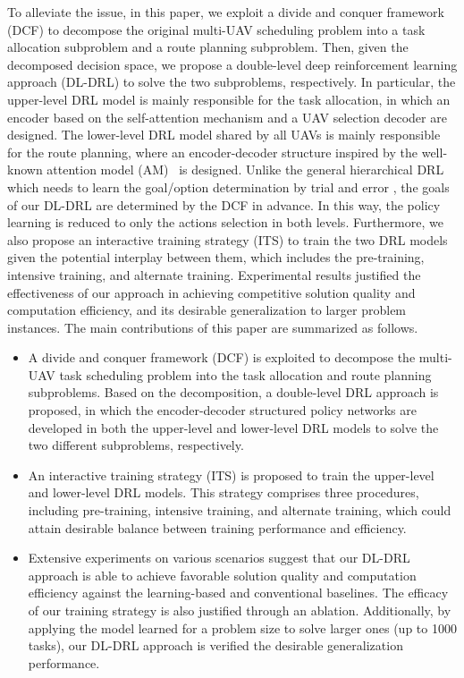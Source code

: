 \documentclass[lettersize,journal]{IEEEtran}
\begin{document}
	To alleviate the issue, in this paper, we exploit a divide and conquer framework (DCF) to decompose the original multi-UAV scheduling problem into a task allocation subproblem and a route planning subproblem. Then, given the decomposed decision space, we propose a double-level deep reinforcement learning approach (DL-DRL) to solve the two subproblems, respectively. In particular, the upper-level DRL model is mainly responsible for the task allocation, in which an encoder based on the self-attention mechanism \cite{vaswaniAttentionAllYou2017} and a UAV selection decoder are designed. The lower-level DRL model shared by all UAVs is mainly responsible for the route planning, where an encoder-decoder structure inspired by the well-known attention model (AM)~\cite{koolATTENTIONLEARNSOLVE2019a} is designed. Unlike the general hierarchical DRL which needs to learn the goal/option determination by trial and error \cite{baconOptionCriticArchitecture2017, nachumDataEfficientHierarchicalReinforcement2018}, the goals of our DL-DRL are determined by the DCF in advance. In this way, the policy learning is reduced to only the actions selection in both levels. Furthermore, we also propose an interactive training strategy (ITS) to train the two DRL models given the potential interplay between them, which includes the pre-training, intensive training, and alternate training. Experimental results justified the effectiveness of our approach in achieving competitive solution quality and computation efficiency, and its desirable generalization to larger problem instances. The main contributions of this paper are summarized as follows. 
	\begin{itemize}
		
		\item A  divide and conquer framework (DCF) is exploited to decompose the multi-UAV task scheduling problem into the task allocation and route planning subproblems. Based on the decomposition, a double-level DRL approach is proposed, in which the encoder-decoder structured policy networks are developed in both the upper-level and lower-level DRL models to solve the two different subproblems, respectively.
		
		\item An interactive training strategy (ITS) is proposed to train the upper-level and lower-level DRL models. This strategy comprises three procedures, including pre-training, intensive training, and alternate training, which could attain desirable balance between training performance and efficiency.
		
		\item Extensive experiments on various scenarios suggest that our DL-DRL approach is able to achieve favorable solution quality and computation efficiency against the learning-based and conventional baselines. The efficacy of our training strategy is also justified through an ablation. Additionally, by applying the model learned for a problem size to solve larger ones (up to 1000 tasks), our DL-DRL approach is verified the desirable generalization performance.
		
	\end{itemize}
	
\end{document}
